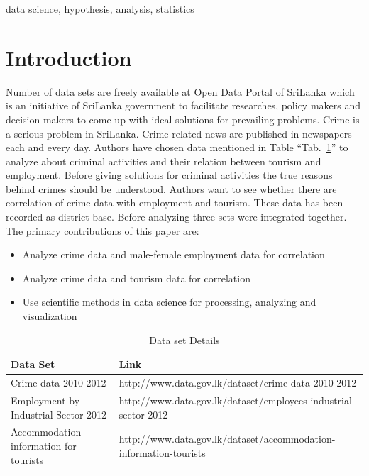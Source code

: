 \documentclass[conference]{IEEEtran}
\begin{document}
\begin{IEEEkeywords}
data science, hypothesis, analysis, statistics
\end{IEEEkeywords}

\section{Introduction}
Number of data sets are freely available at Open Data Portal \cite{b2} of SriLanka which is an initiative of SriLanka government to facilitate researches, policy makers and decision makers to come up with ideal solutions for prevailing problems. Crime is a serious problem in SriLanka. Crime related news are published in newspapers each and every day. Authors have chosen data mentioned in Table ``Tab.~\ref{tab1}'' to analyze about criminal activities and their relation between tourism and employment.
Before giving solutions for criminal activities the true reasons behind crimes should be understood. Authors want to see whether there are correlation of crime data with employment and tourism. These data has been recorded as district base. Before analyzing three sets were integrated together. The primary contributions of this paper are:
\begin{itemize}
\item Analyze crime data and male-female employment data for correlation
\item Analyze crime data and tourism data for correlation
\item Use scientific methods in data science for processing, analyzing and visualization
\end{itemize}

\begin{table}[htbp]
\caption{Data set Details}
\begin{center}
\begin{tabular}{|p{3cm}|p{6cm}|}
\hline
\textbf{Data Set}& \textbf{Link}\\[14pt]
\hline
Crime data 2010-2012 & http://www.data.gov.lk/dataset/crime-data-2010-2012 \\[5pt]
Employment by Industrial Sector 2012& http://www.data.gov.lk/dataset/employees-industrial-sector-2012\\[5pt]
Accommodation information for tourists& http://www.data.gov.lk/dataset/accommodation-information-tourists\\[5pt]
\hline
\end{tabular}
\label{tab1}
\end{center}
\end{table}
\end{document}
